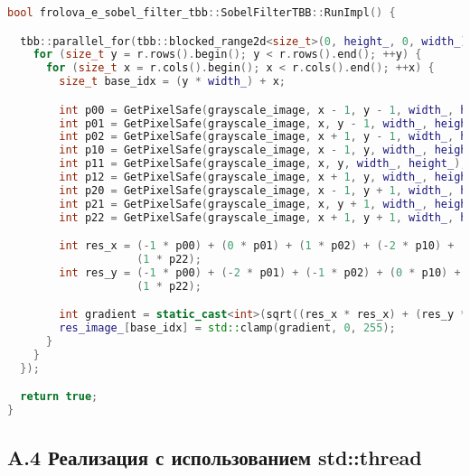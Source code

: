 \documentclass{report}
\begin{document}
\begin{lstlisting}[language=C++,caption={TBB Version}]
bool frolova_e_sobel_filter_tbb::SobelFilterTBB::RunImpl() {

  tbb::parallel_for(tbb::blocked_range2d<size_t>(0, height_, 0, width_), [&](const tbb::blocked_range2d<size_t>& r) {
    for (size_t y = r.rows().begin(); y < r.rows().end(); ++y) {
      for (size_t x = r.cols().begin(); x < r.cols().end(); ++x) {
        size_t base_idx = (y * width_) + x;

        int p00 = GetPixelSafe(grayscale_image, x - 1, y - 1, width_, height_);
        int p01 = GetPixelSafe(grayscale_image, x, y - 1, width_, height_);
        int p02 = GetPixelSafe(grayscale_image, x + 1, y - 1, width_, height_);
        int p10 = GetPixelSafe(grayscale_image, x - 1, y, width_, height_);
        int p11 = GetPixelSafe(grayscale_image, x, y, width_, height_);
        int p12 = GetPixelSafe(grayscale_image, x + 1, y, width_, height_);
        int p20 = GetPixelSafe(grayscale_image, x - 1, y + 1, width_, height_);
        int p21 = GetPixelSafe(grayscale_image, x, y + 1, width_, height_);
        int p22 = GetPixelSafe(grayscale_image, x + 1, y + 1, width_, height_);

        int res_x = (-1 * p00) + (0 * p01) + (1 * p02) + (-2 * p10) + (0 * p11) + (2 * p12) + (-1 * p20) + (0 * p21) +
                    (1 * p22);
        int res_y = (-1 * p00) + (-2 * p01) + (-1 * p02) + (0 * p10) + (0 * p11) + (0 * p12) + (1 * p20) + (2 * p21) +
                    (1 * p22);

        int gradient = static_cast<int>(sqrt((res_x * res_x) + (res_y * res_y)));
        res_image_[base_idx] = std::clamp(gradient, 0, 255);
      }
    }
  });

  return true;
}
\end{lstlisting}

\subsection*{A.4 Реализация с использованием std::thread}
\end{document}

